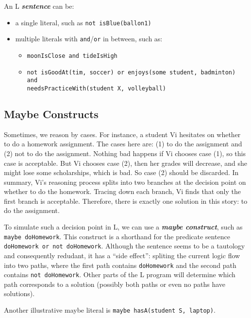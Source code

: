 \documentclass[letterpaper,10pt]{article}
\begin{document}
\begin{flushleft}
An L \textbf{\textit{sentence}} can be:
\begin{itemize}
\item
a single literal, such as \texttt{not isBlue(ballon1)}

\item
multiple literals with \texttt{and}/\texttt{or} in between, such as:
\begin{itemize}
\item \texttt{moonIsClose and tideIsHigh}
\item \texttt{not isGoodAt(tim, soccer) or enjoys(some student, badminton) and \\
needsPracticeWith(student X, volleyball)}
\end{itemize}
\end{itemize}

\pagebreak

\subsection{Maybe Constructs}

Sometimes, we reason by cases. For instance, a student Vi hesitates on whether to do a homework assignment. The cases here are: (1) to do the assignment and (2) not to do the assignment. Nothing bad happens if Vi chooses case (1), so this case is acceptable. But Vi chooses case (2), then her grades will decrease, and she might lose some scholarships, which is bad. So case (2) should be discarded. In summary, Vi's reasoning process splits into two branches at the decision point on whether to do the homework. Tracing down each branch, Vi finds that only the first branch is acceptable. Therefore, there is exactly one solution in this story: to do the assignment.

To simulate such a  decision point in L, we can use a \textbf{\textit{maybe construct}}, such as \texttt{maybe doHomework}. This construct is a shorthand for the predicate sentence \texttt{doHomework or not doHomework}. Although the sentence seems to be a tautology and consequently redudant, it has a ``side effect'': spliting the current logic flow into two paths, where the first path contains \texttt{doHomework} and the second path contains \texttt{not doHomework}. Other parts of the L program will determine which path corresponds to a solution (possibly both paths or even no paths have solutions).

Another illustrative maybe literal is \texttt{maybe hasA(student S, laptop)}.


\end{flushleft}
\end{document}
